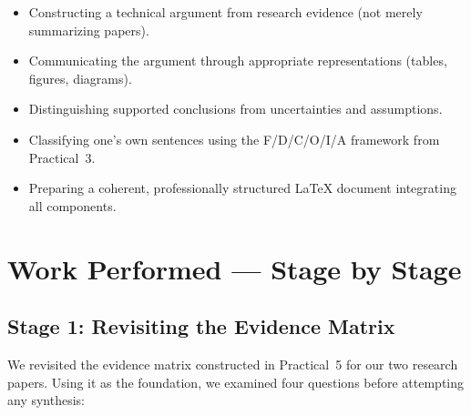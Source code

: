 \documentclass[11pt, a4paper]{article}
\begin{document}
\begin{itemize}[nosep]
    \item Constructing a technical argument from research evidence (not merely summarizing papers).
    \item Communicating the argument through appropriate representations (tables, figures, diagrams).
    \item Distinguishing supported conclusions from uncertainties and assumptions.
    \item Classifying one's own sentences using the F/D/C/O/I/A framework from Practical~3.
    \item Preparing a coherent, professionally structured LaTeX document integrating all components.
\end{itemize}

\section{Work Performed --- Stage by Stage}

\subsection{Stage 1: Revisiting the Evidence Matrix}
We revisited the evidence matrix constructed in Practical~5 for our two research papers. Using it as the foundation, we examined four questions before attempting any synthesis:
\end{document}
